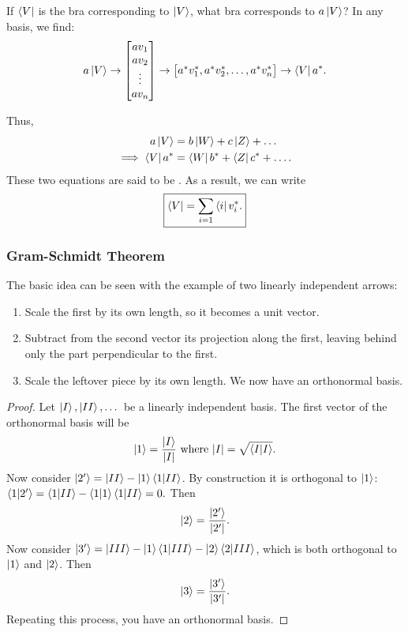If $\bra{V}$ is the bra corresponding to $\ket{V}$, what bra corresponds to $a\ket{V}$? In any basis, we find:
\begin{equation}\label{adjoint of multiplied ket}
    a\ket{V} \rightarrow
    \begin{bmatrix}
    av_1 \\
    av_2 \\
    \vdots \\
    av_n
    \end{bmatrix}
    \rightarrow
    \begin{bmatrix}
    a^*v_1^*, a^*v_2^*, \dots, a^*v_n^*
    \end{bmatrix}
    \rightarrow \bra{V}a^*.
\end{equation}

Thus,
\begin{align*}
    a\ket{V} &= b\ket{W} + c\ket{Z} + \dots \\
    \implies \bra{V}a^* &= \bra{W}b^* + \bra{Z}c^* + \dots.
\end{align*}
These two equations are said to be . As a result, we can write
\begin{equation}\label{adjoint expansion}
    \boxed{\bra{V} = \sum_{i = 1} \bra{i}v_i^*.}
\end{equation}

\subsubsection{Gram-Schmidt Theorem}

\begin{shaded*}
The basic idea can be seen with the example of two linearly independent arrows:
\begin{enumerate}
    \item Scale the first by its own length, so it becomes a unit vector.
    \item Subtract from the second vector its projection along the first, leaving behind only the part perpendicular to the first.
    \item Scale the leftover piece by its own length. We now have an orthonormal basis.
\end{enumerate}
\end{shaded*}

\begin{proof}
 Let $\ket{I}, \ket{II}, \dots$ be a linearly independent basis. The first vector of the orthonormal basis will be $$\ket{1} = \frac{\ket{I}}{|I|} \text{ where } |I| = \sqrt{\braket{I}{I}}.$$ Now consider $\ket{2'} = \ket{II} - \ket{1}\braket{1}{II}$. By construction it is orthogonal to $\ket{1}$: \\$\braket{1}{2'} = \braket{1}{II} - \braket{1}{1}\braket{1}{II} = 0.$ Then $$\ket{2} = \frac{\ket{2'}}{|2'|}.$$ Now consider $\ket{3'} = \ket{III} - \ket{1}\braket{1}{III} - \ket{2}\braket{2}{III}$, which is both orthogonal to $\ket{1}$ and $\ket{2}$. Then $$\ket{3} = \frac{\ket{3'}}{|3'|}.$$ Repeating this process, you have an orthonormal basis.
\end{proof}

